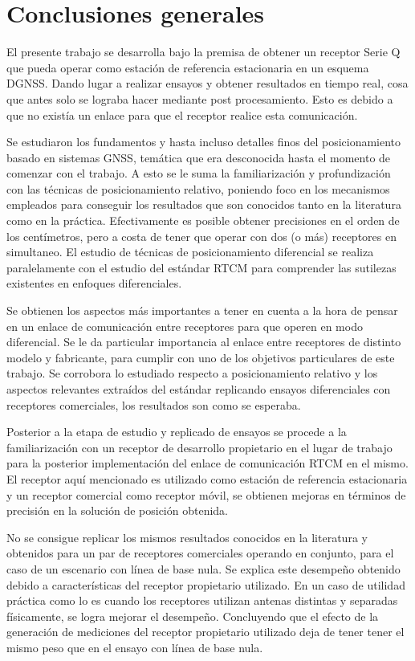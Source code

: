 \documentclass[a4paper,12pt,oneside,onecolumn,final,openright]{book}%
\begin{document}
\chapter*{Conclusiones generales}\label{ch:conclusion}
	El presente trabajo se desarrolla bajo la premisa de obtener un receptor Serie Q que pueda operar como estación de referencia estacionaria en un esquema DGNSS. Dando lugar a realizar ensayos y obtener resultados en tiempo real, cosa que antes solo se lograba hacer mediante post procesamiento. Esto es debido a que no existía un enlace para que el receptor realice esta comunicación. 
	
	Se estudiaron los fundamentos y hasta incluso detalles finos del posicionamiento basado en sistemas GNSS, temática que era desconocida hasta el momento de comenzar con el trabajo. A esto se le suma la familiarización y profundización con las técnicas de posicionamiento relativo, poniendo foco en los mecanismos empleados para conseguir los resultados que son conocidos tanto en la literatura como en la práctica. Efectivamente es posible obtener precisiones en el orden de los centímetros, pero a costa de tener que operar con dos (o más) receptores en simultaneo. El estudio de técnicas de posicionamiento diferencial se realiza paralelamente con el estudio del estándar RTCM para comprender las sutilezas existentes en enfoques diferenciales.
	
	Se obtienen los aspectos más importantes a tener en cuenta a la hora de pensar en un enlace de comunicación entre receptores para que operen en modo diferencial. Se le da particular importancia al enlace entre receptores de distinto modelo y fabricante, para cumplir con uno de los objetivos particulares de este trabajo. Se corrobora lo estudiado respecto a posicionamiento relativo y los aspectos relevantes extraídos del estándar replicando ensayos diferenciales con receptores comerciales, los resultados son como se esperaba. 
	
	Posterior a la etapa de estudio y replicado de ensayos se procede a la familiarización con un receptor de desarrollo propietario en el lugar de trabajo para la posterior implementación del enlace de comunicación RTCM en el mismo. El receptor aquí mencionado es utilizado como estación de referencia estacionaria y un receptor comercial como receptor móvil, se obtienen mejoras en términos de precisión en la solución de posición obtenida. 
	
	No se consigue replicar los mismos resultados conocidos en la literatura y obtenidos para un par de receptores comerciales operando en conjunto, para el caso de un escenario con línea de base nula. Se explica este desempeño obtenido debido a características del receptor propietario utilizado. En un caso de utilidad práctica como lo es cuando los receptores utilizan antenas distintas y separadas físicamente, se logra mejorar el desempeño. Concluyendo que el efecto de la generación de mediciones del receptor propietario utilizado deja de tener tener el mismo peso que en el ensayo con línea de base nula.
	
\end{document}
